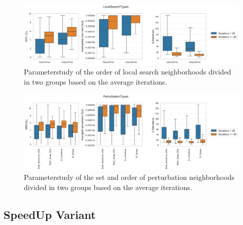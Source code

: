 \begin{figure}[!ht]
    \centering
    \includegraphics[width=\textwidth]{pictures/LocalSearchTypes_base_parameter_study.png}
    \caption{Parameterstudy of the order of local search neighborhoods divided in two groups based on the average iterations.}
    \label{fig:parameterstudy_NoClassifier_localSearch}
\end{figure}

\begin{figure}[!ht]
    \centering
    \includegraphics[width=\textwidth]{pictures/PerturbationTypes_base_parameter_study.png}
    \caption{Parameterstudy of the set and order of perturbation neighborhoods divided in two groups based on the average iterations.}
    \label{fig:parameterstudy_NoClassifier_perturbation}
\end{figure}

\subsection{SpeedUp Variant}
\label{app:subsec:parameterstudy_SpeedUp}


